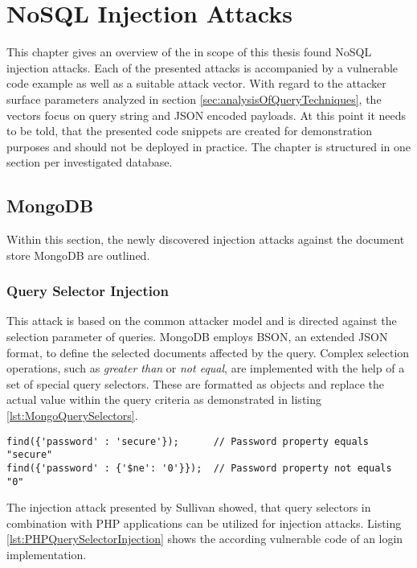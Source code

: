 \chapter{NoSQL Injection Attacks}
This chapter gives an overview of the in scope of this thesis found NoSQL injection attacks. Each of the presented attacks is accompanied by a vulnerable code example as well as a suitable attack vector. With regard to the attacker surface parameters analyzed in section \ref{sec:analysisOfQueryTechniques}, the vectors focus on query string and JSON encoded payloads. At this point it needs to be told, that the presented code snippets are created for demonstration purposes and should not be deployed in practice. The chapter is structured in one section per investigated database.

\section{MongoDB}
Within this section, the newly discovered injection attacks against the document store MongoDB are outlined.

\subsection{Query Selector Injection}
This attack is based on the common attacker model and is directed against the selection parameter of queries. MongoDB employs BSON, an extended JSON format, to define the selected documents affected by the query. Complex selection operations, such as \emph{greater than} or \emph{not equal}, are implemented with the help of a set of special query selectors. These are formatted as objects and replace the actual value within the query criteria as demonstrated in listing \ref{lst:MongoQuerySelectors}.  \\

\begin{lstlisting}[caption={Example for MongoDB's query selectors}, label={lst:MongoQuerySelectors}]
find({'password' : 'secure'});      // Password property equals "secure"
find({'password' : {'$ne': '0'}});  // Password property not equals "0"
\end{lstlisting}

The injection attack presented by Sullivan \cite{Sullivan:2011} showed, that query selectors in combination with PHP applications can be utilized for injection attacks. Listing \ref{lst:PHPQuerySelectorInjection} shows the according vulnerable code of an login implementation. \\

